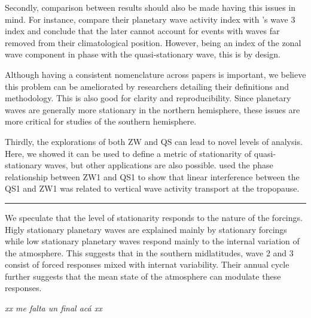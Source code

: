 \documentclass[draft,linenumbers]{agujournal2018}
\begin{document}
Secondly, comparison between results should also be made having this
issues in mind. For instance, \citet{Irving2015} compare their planetary
wave activity index with \citet{Raphael2004}'s wave 3 index and conclude
that the later cannot account for events with waves far removed from
their climatological position. However, being an index of the zonal wave
component in phase with the quasi-stationary wave, this is by design.

Although having a consistent nomenclature across papers is important, we
believe this problem can be ameliorated by researchers detailing their
definitions and methodology. This is also good for clarity and
reproducibility. Since planetary waves are generally more stationary in
the northern hemisphere, these issues are more critical for studies of
the southern hemisphere.

Thirdly, the explorations of both ZW and QS can lead to novel levels of
analysis. Here, we showed it can be used to define a metric of
stationarity of quasi-stationary waves, but other applications are also
possible. \citet{Smith2012} used the phase relationship between ZW1 and
QS1 to show that linear interference between the QS1 and ZW1 was related
to vertical wave activity transport at the tropopause.

\begin{center}\rule{0.5\linewidth}{\linethickness}\end{center}

We speculate that the level of stationarity responds to the nature of
the forcings. Higly stationary planetary waves are explained mainly by
stationary forcings while low stationary planetary waves respond mainly
to the internal variation of the atmosphere. This suggests that in the
southern midlatitudes, wave 2 and 3 consist of forced responses mixed
with internat variability. Their annual cycle further suggests that the
mean state of the atmosphere can modulate these responses.

\emph{xx me falta un final acá xx}


\end{document}
